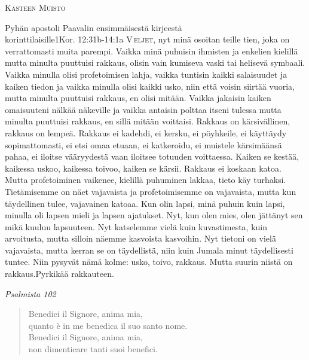 \documentclass[11pt,a4paper]{book}
\renewcommand{\intestfont}[1]{{\Large\scshape\textcolor{SAGEcolor}{#1}}} %
\newcommand{\sottomomento}[1]{{\intestfont{#1}}\par\medskip}
\begin{document}
\begin{pages}
\begin{Rightside}
  \pstart 
  \vspace{0.5in}
        \sottomomento{Kasteen Muisto}
  \pend 
  \pstart 
  \vspace{0.2in}
        \introduzioneFIN
  \pend
  \pstart 
        \membattFIN
  \pend
  \pstart 
  \pend 
  \pstart 
  \vspace{0.5in}
        \begin{letturaFIN}[]{Pyhän apostoli Paavalin ensimmäisestä kirjeestä\\ korinttilaisille}{1Kor. 12:31b-14:1a} %
        \lettrine[nindent=0pt,slope=-0.6em,lines=3]{V}{\,eljet}, nyt minä osoitan teille tien, joka on verrattomasti muita parempi. Vaikka minä puhuisin ihmisten ja enkelien kielillä mutta minulta puuttuisi rakkaus, olisin vain kumiseva vaski tai helisevä symbaali. Vaikka minulla olisi profetoimisen lahja, vaikka tuntisin kaikki salaisuudet ja kaiken tiedon ja vaikka minulla olisi kaikki usko, niin että voisin siirtää vuoria, mutta minulta puuttuisi rakkaus, en olisi mitään. Vaikka jakaisin kaiken omaisuuteni nälkää näkeville ja vaikka antaisin polttaa itseni tulessa mutta minulta puuttuisi rakkaus, en sillä mitään voittaisi. Rakkaus on kärsivällinen, rakkaus on lempeä. Rakkaus ei kadehdi, ei kersku, ei pöyhkeile, ei käyttäydy sopimattomasti, ei etsi omaa etuaan, ei katkeroidu, ei muistele kärsimäänsä pahaa, ei iloitse vääryydestä vaan iloitsee totuuden voittaessa. Kaiken se kestää, kaikessa uskoo, kaikessa toivoo, kaiken se kärsii. Rakkaus ei koskaan katoa. Mutta profetoiminen vaikenee, kielillä puhuminen lakkaa, tieto käy turhaksi. Tietämisemme on näet vajavaista ja profetoimisemme on vajavaista, mutta kun täydellinen tulee, vajavainen katoaa. Kun olin lapsi, minä puhuin kuin lapsi, minulla oli lapsen mieli ja lapsen ajatukset. Nyt, kun olen mies, olen jättänyt sen mikä kuuluu lapsuuteen. Nyt katselemme vielä kuin kuvastimesta, kuin arvoitusta, mutta silloin näemme kasvoista kasvoihin. Nyt tietoni on vielä vajavaista, mutta kerran se on täydellistä, niin kuin Jumala minut täydellisesti tuntee. Niin pysyvät nämä kolme: usko, toivo, rakkaus. Mutta suurin niistä on rakkaus.Pyrkikää rakkauteen.\\
        \end{letturaFIN}
  \pend 
  \pstart 
  \vspace{0.5in}
        \noindent\intestfont{Vuoropsalmi}\hfil {\small\itshape\textcolor{crosscolor}{Psalmista 102}}
  \pend 
  \pstart
  \vspace{0.1in}
        \rispostasalmoFIN
  \pend
  \pstart 
  \vspace{0.3in}
        \begin{verse}
            Benedici il Signore, anima mia,\\
            quanto è in me benedica il suo santo nome.\\
            Benedici il Signore, anima mia,\\
            non dimenticare tanti suoi benefici.\\
            \rispostasalmoFIN


\end{verse}
\end{Rightside}
\end{pages}
\end{document}
